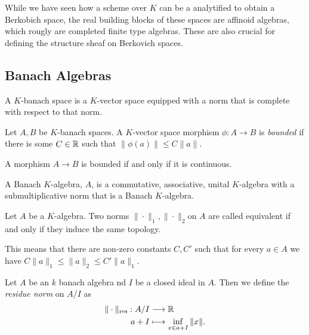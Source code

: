 While we have seen how a scheme over $K$ can be a analytified to obtain a Berkobich space, the real building blocks of these spaces are affinoid algebras, which rougly are completed finite type algebras. 
These are also crucial for defining the structure sheaf on Berkovich spaces. 

\subsection{Banach Algebras} \label{sec:banach_algebras}
\begin{definition}
	A $K$-banach space is a $K$-vector space equipped with a norm that is complete with respect to that norm. 
\end{definition}

\begin{definition}
	Let $A, B$ be $K$-banach spaces. 
	A $K$-vector space morphism $\phi: A \to B$ is \emph{bounded} if there is some $C\in \mathbb{R}$ such that $\|\phi(a)\|\le C \|a\| $. 
\end{definition}

\begin{lemma}
	A morphism $A \to B$ is bounded if and only if it is continuous. 
\end{lemma}

\begin{definition}
	A Banach $K$-algebra, $A$, is a commutative, associative, unital $K$-algebra with a submultiplicative norm that is a Banach $K$-algebra.
\end{definition}
\begin{definition}
	Let $A$ be a $K$-algebra. 
	Two norms $\|\cdot \|_1, \|\cdot \|_2$on $A$ are called equivalent if and only if they induce the same topology. 

	This means that there are non-zero constants $C, C'$ such that for every $ a\in A$ we have $C\|a\|_1 \le \|a\|_2 \le C'\|a\|_1$. 
\end{definition}

\begin{definition}
	Let $A$ be an $k$ banach algebra nd $I$ be a closed ideal in $A$. 
	Then we define the \emph{residue norm} on $A / I$ as 
	\begin{align*}
		\|\cdot \|_\text{res} : A / I &\longrightarrow \mathbb{R} \\
		a + I &\longmapsto \inf_{x \in a + I} \|x\|
	.\end{align*}
\end{definition}

